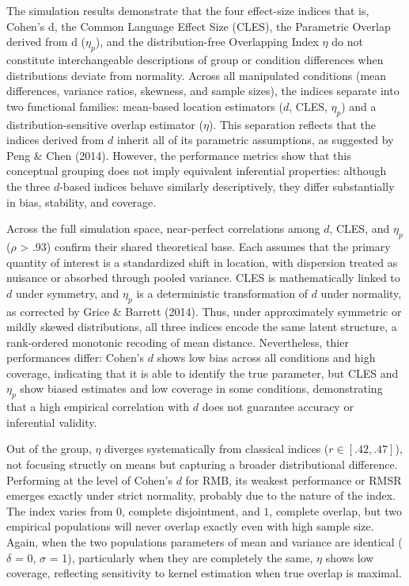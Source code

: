 \documentclass[
  12pt,
  a4paper,
  DIV=11,
  numbers=noendperiod]{scrartcl}
\begin{document}
The simulation results demonstrate that the four effect-size indices
that is, Cohen's d, the Common Language Effect Size (CLES), the
Parametric Overlap derived from d (\(\eta_p\)), and the
distribution-free Overlapping Index \(\eta\) do not constitute
interchangeable descriptions of group or condition differences when
distributions deviate from normality. Across all manipulated conditions
(mean differences, variance ratios, skewness, and sample sizes), the
indices separate into two functional families: mean-based location
estimators (\(d\), CLES, \(\eta_p\)) and a distribution-sensitive
overlap estimator (\(\eta\)). This separation reflects that the indices
derived from \(d\) inherit all of its parametric assumptions, as
suggested by Peng \& Chen (2014). However, the performance metrics show
that this conceptual grouping does not imply equivalent inferential
properties: although the three \(d\)-based indices behave similarly
descriptively, they differ substantially in bias, stability, and
coverage.

Across the full simulation space, near-perfect correlations among \(d\),
CLES, and \(\eta_p\) (\(\rho\) \textgreater{} .93) confirm their shared
theoretical base. Each assumes that the primary quantity of interest is
a standardized shift in location, with dispersion treated as nuisance or
absorbed through pooled variance. CLES is mathematically linked to \(d\)
under symmetry, and \(\eta_p\) is a deterministic transformation of
\(d\) under normality, as corrected by Grice \& Barrett (2014). Thus,
under approximately symmetric or mildly skewed distributions, all three
indices encode the same latent structure, a rank-ordered monotonic
recoding of mean distance. Nevertheless, thier performances differ:
Cohen's \(d\) shows low bias across all conditions and high coverage,
indicating that it is able to identify the true parameter, but CLES and
\(\eta_p\) show biased estimates and low coverage in some conditions,
demonstrating that a high empirical correlation with \(d\) does not
guarantee accuracy or inferential validity.

Out of the group, \(\eta\) diverges systematically from classical
indices (\(r \in [ .42, .47 ]\)), not focusing structly on means but
capturing a broader distributional difference. Performing at the level
of Cohen's \(d\) for RMB, its weakest performance or RMSR emerges
exactly under strict normality, probably due to the nature of the index.
The index varies from \(0\), complete disjointment, and \(1\), complete
overlap, but two empirical populations will never overlap exactly even
with high sample size. Again, when the two populations parameters of
mean and variance are identical (\(\delta\) = 0, \(\sigma\) = 1),
particularly when they are completely the same, \(\eta\) shows low
coverage, reflecting sensitivity to kernel estimation when true overlap
is maximal.
\end{document}
